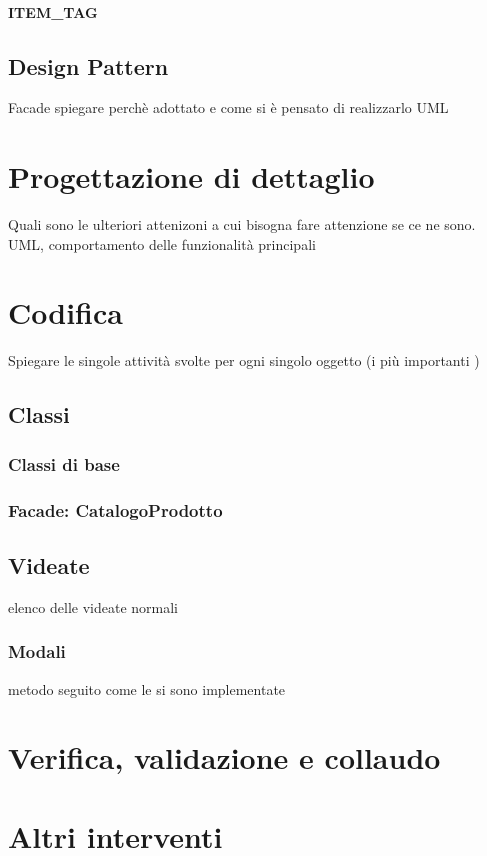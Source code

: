 \paragraph{ITEM\_TAG}



\subsection{Design Pattern}
Facade spiegare perchè adottato e come si è pensato di realizzarlo
UML

\section{Progettazione di dettaglio}
Quali sono le ulteriori attenizoni a cui bisogna fare attenzione se ce ne sono.
UML, comportamento delle funzionalità principali


\section{Codifica}
Spiegare le singole attività svolte per ogni singolo oggetto (i più importanti )

\subsection{Classi}

\subsubsection{Classi di base}

\subsubsection{Facade: CatalogoProdotto}


\subsection{Videate}
elenco delle videate normali

\subsubsection{Modali}
metodo seguito come le si sono implementate


\section{Verifica, validazione e collaudo}


\section{Altri interventi}



